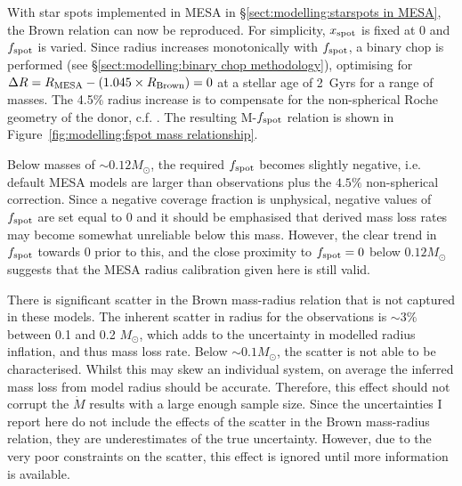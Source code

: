 With star spots implemented in MESA in \S\ref{sect:modelling:starspots in MESA}, the Brown relation can now be reproduced.
For simplicity, $x_{\rm spot}$ is fixed at 0 and $f_{\rm spot}$ is varied.
Since radius increases monotonically with $f_{\rm spot}$, a binary chop is performed (see \S\ref{sect:modelling:binary chop methodology}), optimising for $\Delta R=R_{\rm MESA}-(1.045\times R_{\rm Brown})=0$ at a stellar age of 2~Gyrs for a range of masses. The 4.5\% radius increase is to compensate for the non-spherical Roche geometry of the donor, c.f. \citet{knigge11}.
The resulting M-$f_{\rm spot}$ relation is shown in Figure~\ref{fig:modelling:fspot mass relationship}.

Below masses of $\sim 0.12 M_\odot$, the required $f_{\rm spot}$ becomes slightly negative, i.e. default MESA models are larger than observations plus the $4.5\%$ non-spherical correction.
Since a negative coverage fraction is unphysical, negative values of $f_{\rm spot}$ are set equal to 0 and it should be emphasised that derived mass loss rates may become somewhat unreliable below this mass.
However, the clear trend in $f_{\rm spot}$ towards 0 prior to this, and the close proximity to $f_{\rm spot} = 0$ below $0.12 M_\odot$ suggests that the MESA radius calibration given here is still valid.

There is significant scatter in the Brown mass-radius relation that is not captured in these models. The inherent scatter in radius for the observations is $\sim 3\%$ between 0.1 and 0.2 $M_\odot$, which adds to the uncertainty in modelled radius inflation, and thus mass loss rate. Below $\sim 0.1 M_\odot$, the scatter is not able to be characterised.
Whilst this may skew an individual system, on average the inferred mass loss from model radius should be accurate. Therefore, this effect should not corrupt the $\dot M$ results with a large enough sample size.
Since the uncertainties I report here do not include the effects of the scatter in the Brown mass-radius relation, they are underestimates of the true uncertainty. However, due to the very poor constraints on the scatter, this effect is ignored until more information is available.

